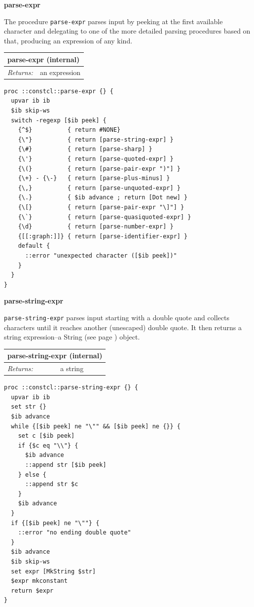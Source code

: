 \documentclass[twoside,9pt]{report}
\begin{document}
\textbf{parse-expr}


The procedure \texttt{parse-expr} parses input by peeking at the first available character and delegating to one of the more detailed parsing procedures based on that, producing an expression of any kind.

\begin{tabular}{ |l l| }
\hline
\multicolumn{2}{|l|}{parse-expr (internal)} \\
\hline
\textit{Returns:} & an expression \\
\hline
\end{tabular}

\noindent\makebox[\linewidth]{\rule{\linewidth}{0.4pt}}
\begin{lstlisting}
proc ::constcl::parse-expr {} {
  upvar ib ib
  $ib skip-ws
  switch -regexp [$ib peek] {
    {^$}          { return #NONE}
    {\"}          { return [parse-string-expr] }
    {\#}          { return [parse-sharp] }
    {\'}          { return [parse-quoted-expr] }
    {\(}          { return [parse-pair-expr ")"] }
    {\+} - {\-}   { return [parse-plus-minus] }
    {\,}          { return [parse-unquoted-expr] }
    {\.}          { $ib advance ; return [Dot new] }
    {\[}          { return [parse-pair-expr "\]"] }
    {\`}          { return [parse-quasiquoted-expr] }
    {\d}          { return [parse-number-expr] }
    {[[:graph:]]} { return [parse-identifier-expr] }
    default {
      ::error "unexpected character ([$ib peek])"
    }
  }
}
\end{lstlisting}
\noindent\makebox[\linewidth]{\rule{\linewidth}{0.4pt}}

\textbf{parse-string-expr}


\texttt{parse-string-expr} parses input starting with a double quote and collects characters until it reaches another (unescaped) double quote. It then returns a string expression--a String (see page \pageref{strings}) object.

\begin{tabular}{ |l l| }
\hline
\multicolumn{2}{|l|}{parse-string-expr (internal)} \\
\hline
\textit{Returns:} & a string \\
\hline
\end{tabular}

\noindent\makebox[\linewidth]{\rule{\linewidth}{0.4pt}}
\begin{lstlisting}
proc ::constcl::parse-string-expr {} {
  upvar ib ib
  set str {}
  $ib advance
  while {[$ib peek] ne "\"" && [$ib peek] ne {}} {
    set c [$ib peek]
    if {$c eq "\\"} {
      $ib advance
      ::append str [$ib peek]
    } else {
      ::append str $c
    }
    $ib advance
  }
  if {[$ib peek] ne "\""} {
    ::error "no ending double quote"
  }
  $ib advance
  $ib skip-ws
  set expr [MkString $str]
  $expr mkconstant
  return $expr
}
\end{lstlisting}
\noindent\makebox[\linewidth]{\rule{\linewidth}{0.4pt}}
\end{document}

